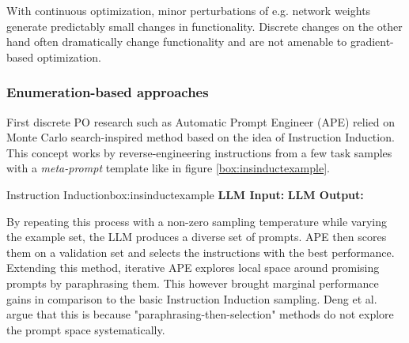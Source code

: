 With continuous optimization, minor perturbations of e.g. network weights generate predictably small changes in functionality.
Discrete changes on the other hand often dramatically change functionality\cite{lehman2022evolutionlargemodels} 
and are not amenable to gradient-based optimization\cite{deng2022rlpromptoptimizingdiscretetext}. 


\subsubsection{Enumeration-based approaches}
First discrete PO research such as Automatic Prompt Engineer\cite{zhou2023largelanguagemodelshumanlevel} (APE)
relied on Monte Carlo search-inspired method based on the idea of Instruction Induction\cite{honovich2022instructioninductionexamplesnatural}.
This concept works by reverse-engineering instructions from a few task samples with a \textit{meta-prompt} template like in figure \ref{box:insinductexample}. 


\begin{figurebox}{Instruction Induction}{box:insinductexample}
    \textbf{LLM Input:} 
    \textbf{LLM Output:}
    
\end{figurebox}

By repeating this process with a non-zero sampling temperature while varying the example set,
the LLM produces a diverse set of prompts. APE then scores them on a validation set and selects the instructions with the best performance.
Extending this method, iterative APE explores local space around promising prompts by paraphrasing them.
This however brought marginal performance gains in comparison to the basic Instruction Induction sampling\cite{zhou2023largelanguagemodelshumanlevel}.
Deng et al.\cite{deng2022rlpromptoptimizingdiscretetext} argue that this is because "paraphrasing-then-selection" methods do not explore the prompt space systematically.

